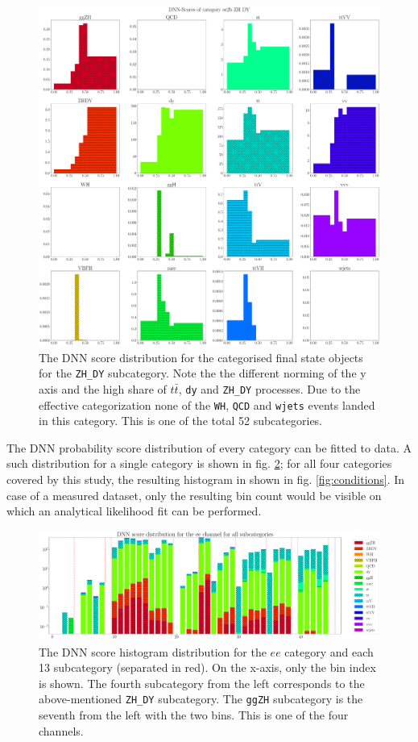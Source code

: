 \begin{figure}[h!]
	\centering
	\includegraphics[width=\linewidth]{figures/analysis/ee_2b_dnn_node_ZH_DY.pdf}
	\caption{The DNN score distribution for the categorised final state objects for the \texttt{ZH\_DY} subcategory. Note the the different norming of the y axis and the high share of $t\bar{t}$, \texttt{dy} and \texttt{ZH\_DY} processes. Due to the effective categorization none of the \texttt{WH}, \texttt{QCD} and \texttt{wjets} events landed in this category. This is one of the total 52 subcategories.}
	\label{fig:ZH_DY_sub}
\end{figure}

The DNN probability score distribution of every category can be fitted to data. A such distribution for a single category is shown in fig. \ref{fig:ee_dnn_score}; for all four categories covered by this study, the resulting histogram in shown in fig. \ref{fig:conditions}. In case of a measured dataset, only the resulting bin count would be visible on which an analytical likelihood fit can be performed.

\begin{figure}[h!]
	\centering
	\includegraphics[width=\linewidth]{figures/analysis/cond1.pdf}
	\caption{The DNN score histogram distribution for the $ee$ category and each 13 subcategory (separated in red). On the x-axis, only the bin index is shown. The fourth subcategory from the left corresponds to the above-mentioned \texttt{ZH\_DY} subcategory. The \texttt{ggZH} subcategory is the seventh from the left with the two bins. This is one of the four channels.}
	\label{fig:ee_dnn_score}
\end{figure}


